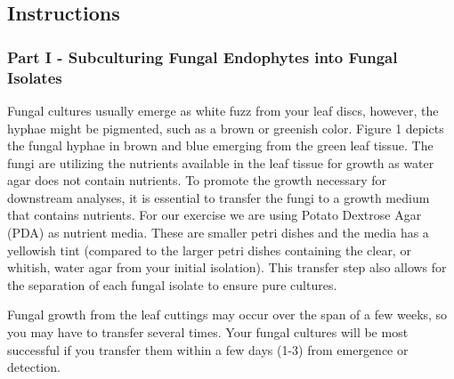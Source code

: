 \documentclass[
  letterpaper,
  DIV=11,
  numbers=noendperiod]{scrreprt}
\begin{document}
\subsection*{Instructions}\label{instructions-1}

\subsubsection*{Part I - Subculturing Fungal Endophytes into Fungal
Isolates}\label{part-i---subculturing-fungal-endophytes-into-fungal-isolates}

Fungal cultures usually emerge as white fuzz from your leaf discs,
however, the hyphae might be pigmented, such as a brown or greenish
color. Figure 1 depicts the fungal hyphae in brown and blue emerging
from the green leaf tissue. The fungi are utilizing the nutrients
available in the leaf tissue for growth as water agar does not contain
nutrients. To promote the growth necessary for downstream analyses, it
is essential to transfer the fungi to a growth medium that contains
nutrients. For our exercise we are using Potato Dextrose Agar (PDA) as
nutrient media. These are smaller petri dishes and the media has a
yellowish tint (compared to the larger petri dishes containing the
clear, or whitish, water agar from your initial isolation). This
transfer step also allows for the separation of each fungal isolate to
ensure pure cultures.

Fungal growth from the leaf cuttings may occur over the span of a few
weeks, so you may have to transfer several times. Your fungal cultures
will be most successful if you transfer them within a few days (1-3)
from emergence or detection.
\end{document}
